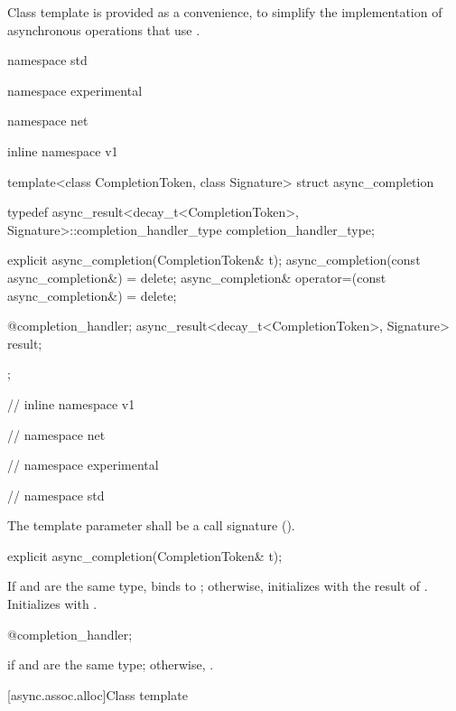 \pnum
Class template  is provided as a convenience, to simplify the implementation of asynchronous operations that use .

\begin{codeblock}
namespace std {
namespace experimental {
namespace net {
inline namespace v1 {

  template<class CompletionToken, class Signature>
  struct async_completion
  {
    typedef async_result<decay_t<CompletionToken>,
      Signature>::completion_handler_type
        completion_handler_type;

    explicit async_completion(CompletionToken& t);
    async_completion(const async_completion&) = delete;
    async_completion& operator=(const async_completion&) = delete;

    @\seebelow@ completion_handler;
    async_result<decay_t<CompletionToken>, Signature> result;
  };

} // inline namespace v1
} // namespace net
} // namespace experimental
} // namespace std
\end{codeblock}

\pnum
The template parameter  shall be a call signature ().

\begin{itemdecl}
explicit async_completion(CompletionToken& t);
\end{itemdecl}

\begin{itemdescr}
\pnum
\effects If  and  are the same type, binds  to ; otherwise, initializes  with the result of . Initializes  with .
\end{itemdescr}

\begin{itemdecl}
@\seebelow@ completion_handler;
\end{itemdecl}

\begin{itemdescr}
\pnum
\ctype {} if  and  are the same type; otherwise, .
\end{itemdescr}



[async.assoc.alloc]{Class template }

